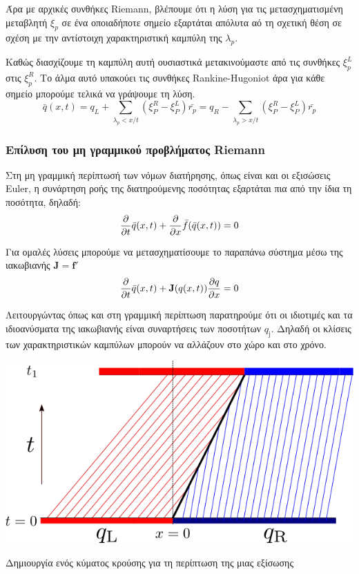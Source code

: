 Άρα με αρχικές συνθήκες Riemann, βλέπουμε ότι η λύση για τις μετασχηματισμένη μεταβλητή $\xi _p$ σε ένα οποιαδήποτε σημείο εξαρτάται απόλυτα αό τη σχετική θέση σε σχέση με την αντίστοιχη χαρακτηριστική καμπύλη της $\lambda _p$.  

Καθώς διασχίζουμε τη καμπύλη αυτή ουσιαστικά μετακινούμαστε από τις συνθήκες $\xi^L_p$ στις $\xi^R_p$. Το άλμα αυτό υπακούει τις συνθήκες Rankine-Hugoniot  άρα για κάθε σημείο μπορούμε τελικά να γράψουμε τη λύση.
\begin{equation}
\bar{q}(x,t)=q_L + \sum_{\lambda_p<x/t} (\xi ^R_P - \xi ^L_P) \bar{r_p}
			=q_R - \sum_{\lambda_p>x/t} (\xi ^R_P - \xi ^L_P) \bar{r_p}
\end{equation}
\subsubsection{Επίλυση του μη γραμμικού προβλήματος Riemann}
Στη μη γραμμική περίπτωσή των νόμων διατήρησης, όπως είναι και οι εξισώσεις Euler, η συνάρτηση ροής της διατηρούμενης ποσότητας εξαρτάται πια από την ίδια τη ποσότητα, δηλαδή:
\begin{equation}
\pdv{t} \bar{q}(x,t) + \pdv{x} \bar{f}(\bar{q}(x,t)) = 0 
\end{equation}

Για ομαλές λύσεις μπορούμε να μετασχηματίσουμε το παραπάνω σύστημα μέσω της ιακωβιανής $\mathbf{J} =\mathbf{f}'$
\begin{equation}
\pdv{t} \bar{q}(x,t) + \mathbf{J}(q(x,t)) \pdv{q}{x}  = 0 
\end{equation}

Λειτουργώντας όπως και στη γραμμική περίπτωση παρατηρούμε ότι οι ιδιοτιμές και τα ιδιοανύσματα της ιακωβιανής είναι συναρτήσεις των ποσοτήτων $q_\mathrm{j}$. Δηλαδή οι κλίσεις των χαρακτηριστικών καμπύλων μπορούν να αλλάζουν στο χώρο και στο χρόνο. 

\begin{marginfigure}
	\centering
	\includegraphics[width=1\linewidth]{Images/shockwave}
	\caption{Δημιουργία ενός κύματος κρούσης για τη περίπτωση της μιας εξίσωσης}
	\label{fig:shockwave}
\end{marginfigure}


